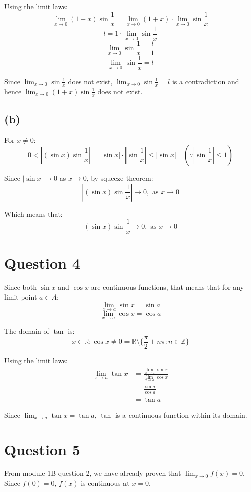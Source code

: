 \documentclass[11pt]{article}
\begin{document}
Using the limit laws:
\[\lim_{x \rightarrow 0} (1 + x) \sin \frac{1}{x} = \lim_{x \rightarrow 0} (1 + x) \cdot \lim_{x \rightarrow 0} \sin \frac{1}{x}\]
\[l = 1 \cdot \lim_{x \rightarrow 0} \sin \frac{1}{x}\]
\[\lim_{x \rightarrow 0} \sin \frac{1}{x} = \frac{l}{1}\]
\[\lim_{x \rightarrow 0} \sin \frac{1}{x} = l\]

Since \(\lim_{x \rightarrow 0} \sin \frac{1}{x}\) does not exist, \(\lim_{x \rightarrow 0} \sin \frac{1}{x} = l\) is a contradiction and hence \(\lim_{x \rightarrow 0} (1 + x) \sin \frac{1}{x}\) does not exist.

\subsection{(b)}
\label{sec:org942d517}
For \(x \neq 0\):
\[0 < \left| (\sin x) \sin \frac{1}{x} \right| = |\sin x| \cdot \left|\sin \frac{1}{x} \right| \leq | \sin x | \quad (\because \left| \sin \frac{1}{x} \right| \leq 1)\]

Since \(| \sin x | \rightarrow 0\) as \(x \rightarrow 0\), by squeeze theorem:
\[\left|(\sin x) \sin \frac{1}{x} \right| \rightarrow 0, \text{ as } x \rightarrow 0\]

Which means that:
\[(\sin x) \sin \frac{1}{x} \rightarrow 0, \text{ as } x \rightarrow 0\]

\section{Question 4}
\label{sec:org7b3b703}
Since both \(\sin x\) and \(\cos x\) are continuous functions, that means that for any limit point \(a \in A\):
\[\lim_{x \rightarrow a} \sin x = \sin a\]
\[\lim_{x \rightarrow a} \cos x = \cos a\]

The domain of \(\tan\) is:
\[x \in \mathbb{R}: \cos x \neq 0 = \mathbb{R} \setminus \{\frac{\pi}{2} + n\pi : n \in \mathbb{Z}\}\]

Using the limit laws:
\begin{align*}
\lim_{x \rightarrow a} \tan x &= \frac{\lim_{x \rightarrow a} \sin x}{\lim_{x \rightarrow a} \cos x} \\
&= \frac{\sin a}{\cos a} \\
&= \tan a
\end{align*}

Since \(\lim_{x \rightarrow a} \tan x = \tan a\), \(\tan\) is a continuous function within its domain.

\section{Question 5}
\label{sec:orgabe353e}
From module 1B question 2, we have already proven that \(\lim_{x \rightarrow 0} f(x) = 0\). Since \(f(0) = 0\), \(f(x)\) is continuous at \(x = 0\).
\\[0pt]
\end{document}
